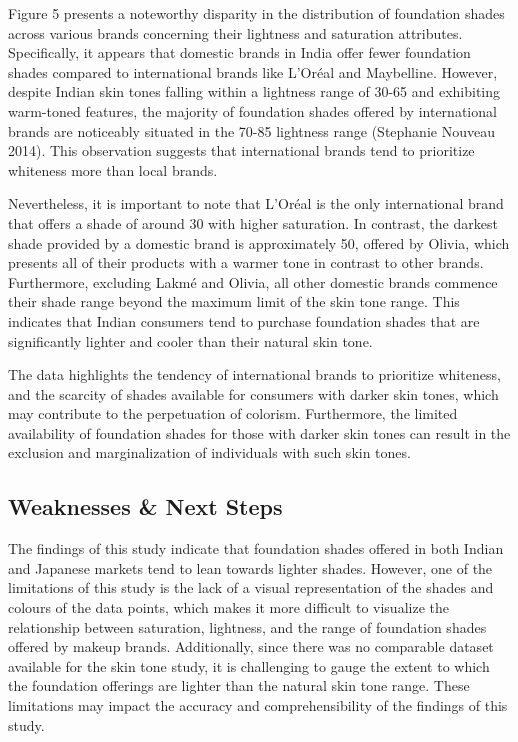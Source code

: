 \documentclass[
  letterpaper,
  DIV=11,
  numbers=noendperiod]{scrartcl}
\begin{document}
Figure 5 presents a noteworthy disparity in the distribution of
foundation shades across various brands concerning their lightness and
saturation attributes. Specifically, it appears that domestic brands in
India offer fewer foundation shades compared to international brands
like L'Oréal and Maybelline. However, despite Indian skin tones falling
within a lightness range of 30-65 and exhibiting warm-toned features,
the majority of foundation shades offered by international brands are
noticeably situated in the 70-85 lightness range (Stephanie Nouveau
2014). This observation suggests that international brands tend to
prioritize whiteness more than local brands.

Nevertheless, it is important to note that L'Oréal is the only
international brand that offers a shade of around 30 with higher
saturation. In contrast, the darkest shade provided by a domestic brand
is approximately 50, offered by Olivia, which presents all of their
products with a warmer tone in contrast to other brands. Furthermore,
excluding Lakmé and Olivia, all other domestic brands commence their
shade range beyond the maximum limit of the skin tone range. This
indicates that Indian consumers tend to purchase foundation shades that
are significantly lighter and cooler than their natural skin tone.

The data highlights the tendency of international brands to prioritize
whiteness, and the scarcity of shades available for consumers with
darker skin tones, which may contribute to the perpetuation of colorism.
Furthermore, the limited availability of foundation shades for those
with darker skin tones can result in the exclusion and marginalization
of individuals with such skin tones.

\newpage

\hypertarget{weaknesses-next-steps}{%
\subsection{Weaknesses \& Next Steps}\label{weaknesses-next-steps}}

The findings of this study indicate that foundation shades offered in
both Indian and Japanese markets tend to lean towards lighter shades.
However, one of the limitations of this study is the lack of a visual
representation of the shades and colours of the data points, which makes
it more difficult to visualize the relationship between saturation,
lightness, and the range of foundation shades offered by makeup brands.
Additionally, since there was no comparable dataset available for the
skin tone study, it is challenging to gauge the extent to which the
foundation offerings are lighter than the natural skin tone range. These
limitations may impact the accuracy and comprehensibility of the
findings of this study.
\end{document}
